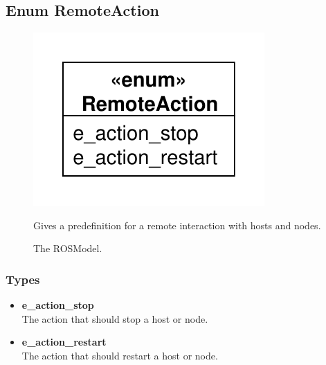\subsection{Enum RemoteAction}
\begin{figure}[htbp]
	\begin{minipage}[t]{7cm}
		\vspace{0pt}
		\centering
		\includegraphics[scale=0.6]{./diagram_pictures/RemoteAction.pdf}
		\caption{The ROSModel.}
	\end{minipage}
	\hfill
	\begin{minipage}[t]{8cm}
		\vspace{10pt}
		Gives a predefinition for a remote interaction with hosts and nodes.
	\end{minipage}
\end{figure}  
\subsubsection{Types}
\begin{itemize}
	\item \textbf{e\_action\_stop}\\
	The action that should stop a host or node.
	\item \textbf{e\_action\_restart}\\
	The action that should restart a host or node.
\end{itemize}

\newpage
